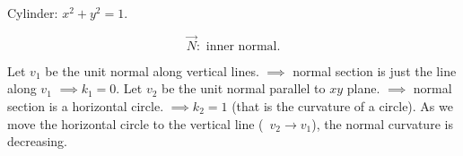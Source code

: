 \begin{center}

        \end{center}
     \begin{example}\label{normal curvature-cylinder}
         Cylinder: \(x^2+y^2=1\).
     \end{example}
        \[\vec{N}:\text{ inner normal.}\]

        Let \(v_1\) be the unit normal along vertical lines.
        \(\implies\) normal section is just the line along \(v_1\) 
        \(\implies k_1=0\). Let \(v_2\) be the unit normal parallel
         to \(xy\) plane. \(\implies \) 
        normal section is a horizontal circle. \(\implies k_2=1\) (that is the 
        curvature of a circle). As we move the horizontal circle to the vertical line
        (\ie\ \(v_2\to v_1\)), the normal curvature is decreasing.
        
